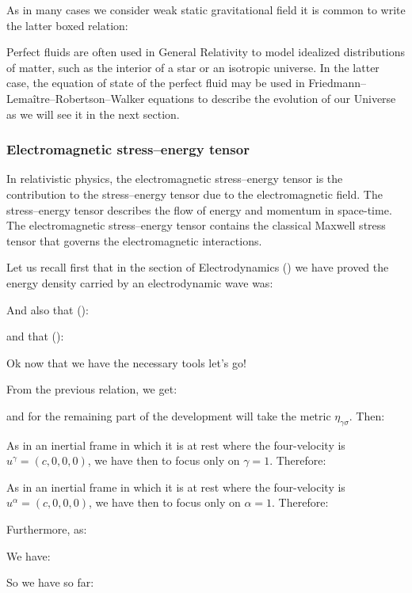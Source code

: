 	As in many cases we consider weak static gravitational field it is common to write the latter boxed relation:
	
	Perfect fluids are often used in General Relativity to model idealized distributions of matter, such as the interior of a star or an isotropic universe. In the latter case, the equation of state of the perfect fluid may be used in Friedmann–Lemaître–Robertson–Walker equations to describe the evolution of our Universe as we will see it in the next section.
	
	\subsubsection{Electromagnetic stress–energy tensor}
	In relativistic physics, the electromagnetic stress–energy tensor is the contribution to the stress–energy tensor due to the electromagnetic field. The stress–energy tensor describes the flow of energy and momentum in space-time. The electromagnetic stress–energy tensor contains the classical Maxwell stress tensor that governs the electromagnetic interactions.
	
	Let us recall first that in the section of Electrodynamics () we have proved the energy density carried by an electrodynamic wave was:
	
	And also that ():
	
	and that ():
	
	Ok now that we have the necessary tools let's go!
	
	From the previous relation, we get:
	
	and for the remaining part of the development will take the metric $\eta_{\gamma\sigma}$. Then:
	
	As in an inertial frame in which it is at rest where the four-velocity is $u^\gamma=(c, 0, 0, 0)$, we have then to focus only on $\gamma=1$. Therefore:
	
	As in an inertial frame in which it is at rest where the four-velocity is $u^\alpha=(c, 0, 0, 0)$, we have then to focus only on $\alpha=1$. Therefore:
	
	Furthermore, as:
	
	We have:
	
	So we have so far:
	
